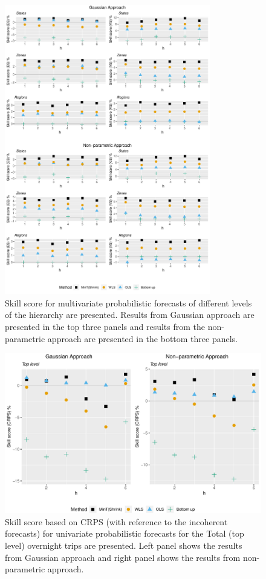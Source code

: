 \documentclass[12pt]{article}
\theoremstyle{definition}
\begin{document}
\begin{figure}
	\centering
	\small
	\includegraphics[width= 0.8\textwidth, height= 0.85\textheight]{Empirical-results/Levels_MultiVScores.pdf}
	\caption{Skill score for multivariate probabilistic forecasts of different levels of the hierarchy are presented. Results from Gaussian approach are presented in the top three panels and results from the non-parametric approach are presented in the bottom three panels.}\label{fig:EmpResults_Levels}
\end{figure}

\begin{figure}
	\centering
	\small
	\includegraphics[width= \textwidth]{Empirical-results/UniVScore_TopLevel.pdf}
	\caption{Skill score based on CRPS (with reference to the incoherent forecasts) for univariate probabilistic forecasts for the Total (top level) overnight trips are presented. Left panel shows the results from Gaussian approach and right panel shows the results from non-parametric approach. }\label{fig:EmpResults_TopLevel}
\end{figure}
\end{document}
